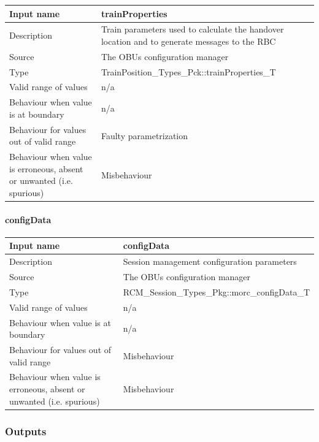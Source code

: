 \begin{longtable}{p{}p{}}
	\toprule
	Input name				& trainProperties \\
	\midrule
	Description				& Train parameters used to calculate the handover location and to generate messages to the RBC \\
	\midrule
	Source					& The OBUs configuration manager \\ 
	\midrule
	Type					& TrainPosition\_Types\_Pck::trainProperties\_T \\
	\midrule
	Valid range of values	& n/a \\
	\midrule
	Behaviour when value is at boundary	& n/a \\
	\midrule
	Behaviour for values out of valid range	& Faulty parametrization \\
	\midrule
	Behaviour when value is erroneous, absent or unwanted (i.e. spurious) & Misbehaviour \\
	\bottomrule
\end{longtable}

\paragraph{configData}

\begin{longtable}{p{}p{}}
	\toprule
	Input name				& configData \\
	\midrule
	Description				& Session management configuration parameters \\
	\midrule
	Source					& The OBUs configuration manager \\ 
	\midrule
	Type					& RCM\_Session\_Types\_Pkg::morc\_configData\_T \\
	\midrule
	Valid range of values	& n/a \\
	\midrule
	Behaviour when value is at boundary	& n/a \\
	\midrule
	Behaviour for values out of valid range	& Misbehaviour \\
	\midrule
	Behaviour when value is erroneous, absent or unwanted (i.e. spurious) & Misbehaviour \\
	\bottomrule
\end{longtable}


\subsubsection{Outputs}\label{s:manage_radio_communication_outputs}

